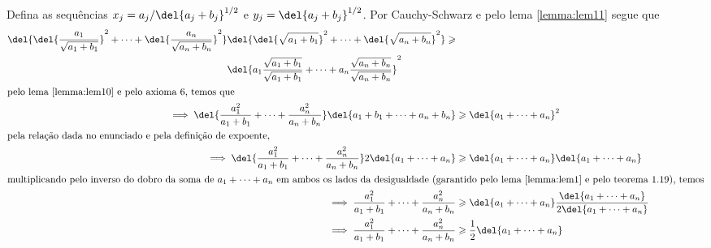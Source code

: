 \documentclass{IMTexam}
\begin{document}
\begin{questions}
\begin{solution}
			Defina as sequências $ x_j=a_j/\del{a_j+b_j}^{1/2} $ e $ y_j=\del{a_j+b_j}^{1/2} $. Por Cauchy-Schwarz e pelo lema \ref{lemma:lem11} segue que
			\begin{align*}
				\begin{split}
					\del{\del{\dfrac{a_1}{\sqrt{a_1+b_1}}}^{2}+\cdots+\del{\dfrac{a_n}{\sqrt{a_n+b_n}}}^{2}}&\del{\del{\sqrt{a_1+b_1}}^{2}+\cdots+\del{\sqrt{a_n+b_n}}^{2}}\geqslant\\
					 &\del{a_1\dfrac{\sqrt{a_1+b_1}}{\sqrt{a_1+b_1}}+\cdots+a_n\dfrac{\sqrt{a_n+b_n}}{\sqrt{a_n+b_n}}}^{2}
				\end{split}\\
				\intertext{pelo lema \ref{lemma:lem10} e pelo axioma 6, temos que}
				\implies\del{\dfrac{a_1^{2}}{a_1+b_1}+\cdots+\dfrac{a_n^{2}}{a_n+b_n}}\del{a_1+b_1+\cdots+a_n+b_n}&\geqslant\del{a_1+\cdots+a_n}^{2}\\
				\intertext{pela relação dada no enunciado e pela definição de expoente,}
				\implies\del{\dfrac{a_1^{2}}{a_1+b_1}+\cdots+\dfrac{a_n^{2}}{a_n+b_n}}2\del{a_1+\cdots+a_n}&\geqslant\del{a_1+\cdots+a_n}\del{a_1+\cdots+a_n}\\
				\intertext{multiplicando pelo inverso do dobro da soma de $ a_1+\cdots+a_n $ em ambos os lados da desigualdade (garantido pelo lema \ref{lemma:lem1} e pelo teorema 1.19), temos}
				\implies\dfrac{a_1^{2}}{a_1+b_1}+\cdots+\dfrac{a_n^{2}}{a_n+b_n}&\geqslant\del{a_1+\cdots+a_n}\dfrac{\del{a_1+\cdots+a_n}}{2\del{a_1+\cdots+a_n}}\\
				\implies \dfrac{a_1^{2}}{a_1+b_1}+\cdots+\dfrac{a_n^{2}}{a_n+b_n}&\geqslant\dfrac{1}{2}\del{a_1+\cdots+a_n}
			\end{align*}
		
		\hfill\qedsymbol
		\end{solution}
		
		
\end{questions}
\end{document}
